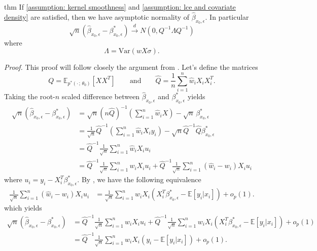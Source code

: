 \documentclass[11pt]{article}
\begin{document}
\begin{restatable}{thm}{} \label{thm: central limit for beta}
    If \cref{assumption: kernel smoothness} and \cref{assumption: lce and covariate density} are satisfied, then we have asymptotic normality of $\hat{\beta}_{x_0,\epsilon}$. In particular
    \[\sqrt{n}(\hat{\beta}_{x_0, \epsilon} - \beta^*_{x_0, \epsilon}) \overset{d}{\rightarrow} N(0, Q^{-1}\Lambda Q^{-1})\]
    where 
    \[\Lambda = \text{Var}(wX\sigma).\]
\end{restatable}
\noindent \textit{Proof.} This proof will follow closely the argument from \citet{Newey_Ruud_2005}. Let's define the matrices
\begin{equation}
    Q = \mathbb{E}_{p^*(\cdot\,;\, \theta_0)}\left[XX^T\right] \qquad \text{and} \qquad \hat{Q} = \frac{1}{n}\sum_{i = 1}^n\hat{w}_iX_iX_i^T.
\end{equation}
Taking the root-$n$ scaled difference between $\hat{\beta}_{x_0, \epsilon}$ and $\beta^*_{x_0, \epsilon}$ yields
\begin{align}
    \sqrt{n}(\hat{\beta}_{x_0, \epsilon} -\beta^*_{x_0, \epsilon}) &= \sqrt{n}\left(n\hat{Q}\right)^{-1}\left(\sum_{i = 1}^n\hat{w}_iX\right) - \sqrt{n}\,\beta_{x_0, \epsilon}^*\\
    &= \frac{1}{\sqrt{n}}\hat{Q}^{-1}\left(\sum_{i = 1}^n\hat{w}_iX_iy_i\right) - \sqrt{n}\hat{Q}^{-1}\hat{Q}\beta_{x_0, \epsilon}^* \\
    &= \hat{Q}^{-1}\frac{1}{\sqrt{n}}\sum_{i=1}^n \hat{w}_iX_iu_i\\
    &= \hat{Q}^{-1}\frac{1}{\sqrt{n}}\sum_{i = 1}^nw_iX_iu_i + \hat{Q}^{-1}\frac{1}{\sqrt{n}}\sum_{i = 1}^n(\hat{w}_i - w_i)X_iu_i\label{eq: asymptotic expansion}
\end{align}
where $u_i = y_i - X_i^T\beta^*_{x_0, \epsilon}$. By , we have the following equivalence
\begin{align}
    \frac{1}{\sqrt{n}}\sum_{i = 1}^n(\hat{w}_i - w_i)X_iu_i &= \frac{1}{\sqrt{n}}\sum_{i = 1}^nw_iX_i\left(X_i^T\beta^*_{x_0, \epsilon} - \mathbb{E}[y_i|x_i]\right) + o_p(1).
\end{align}
which yields
\begin{align}
    \sqrt{n}(\hat{\beta}_{x_0, \epsilon} -\beta^*_{x_0, \epsilon}) &= \hat{Q}^{-1}\frac{1}{\sqrt{n}}\sum_{i = 1}^nw_iX_iu_i + \hat{Q}^{-1}\frac{1}{\sqrt{n}}\sum_{i = 1}^nw_iX_i\left(X_i^T\beta^*_{x_0, \epsilon} - \mathbb{E}[y_i|x_i]\right) + o_p(1) \\
    &= \hat{Q}^{-1}\frac{1}{\sqrt{n}}\sum_{i = 1}^nw_iX_i\left(y_i - \mathbb{E}[y_i|x_i]\right) + o_p(1).
\end{align}
\end{document}

